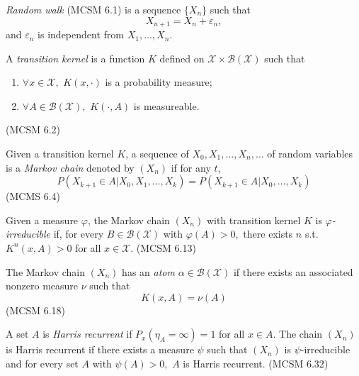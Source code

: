 \begin{definition}
    \emph{Random walk} (MCSM 6.1) is a sequence $\{X_n\}$ such that
    $$X_{n+1} = X_n + \varepsilon_n,$$ and $\varepsilon_n$ is independent from $X_1, \dots, X_n$.
\end{definition}

\begin{definition}
    A \emph{transition kernel} is a function $K$ defined on $\mathcal{X}\times\mathcal{B}(\mathcal{X})$ such that\begin{enumerate}
    \item $\forall x\in\mathcal{X},\,\,K(x,\cdot)$ is a probability measure;
    \item $\forall A\in\mathcal{B}(\mathcal{X}),\,\, K(\cdot, A)$ is measureable.
\end{enumerate} (MCSM 6.2)
\end{definition}

\begin{definition}
    Given a transition kernel $K$, a sequence of $X_0, X_1, \dots, X_n, \dots$ of random variables is a \emph{Markov chain} denoted by $(X_n)$ if for any $t$, $$P(X_{k+1}\in A|X_0, X_1, \dots, X_k) = P(X_{k+1}\in A|X_0, \dots, X_k)$$ (MCMS 6.4)
\end{definition}

\begin{definition}
    Given a measure $\varphi$, the Markov chain $(X_n)$ with transition kernel $K$ is \emph{$\varphi$-irreducible} if, for every $B\in\mathcal{B}(\mathcal{X})$ with $\varphi(A)>0,$ there exists $n$ s.t. $K^n(x, A)>0$ for all $x\in\mathcal{X}$. (MCSM 6.13)
\end{definition}

\begin{definition}[Atom]
    The Markov chain $(X_n)$ has an \emph{atom} ${\alpha\in\mathcal{B}(\mathcal{X})}$ if there exists an associated nonzero measure $\nu$ such that $$K(x, A) = \nu(A)$$ (MCSM 6.18)
\end{definition}

\begin{definition}
    A set $A$ is \emph{Harris recurrent} if $P_x(\eta_A = \infty) = 1$ for all $x\in A.$ The chain $(X_n)$ is Harris recurrent if there exists a measure $\psi$ such that $(X_n)$ is $\psi$-irreducible and for every set $A$ with $\psi(A) > 0,$ $A$ is Harris recurrent. (MCSM 6.32)
\end{definition}

